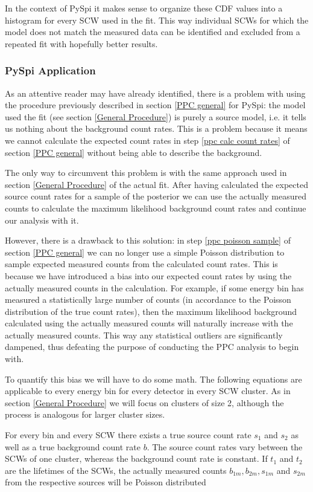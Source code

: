 \documentclass{article}
\begin{document}
In the context of PySpi it makes sense to organize these CDF values into a histogram for every SCW used in the fit. This way individual SCWs for which the model does not match the measured data can be identified and excluded from a repeated fit with hopefully better results.

\subsubsection{PySpi Application}
As an attentive reader may have already identified, there is a problem with using the procedure previously described in section \ref{PPC general} for PySpi: the model used the fit (see section \ref{General Procedure}) is purely a source model, i.e. it tells us nothing about the background count rates. This is a problem because it means we cannot calculate the expected count rates in step \ref{ppc calc count rates} of section \ref{PPC general} without being able to describe the background.

The only way to circumvent this problem is with the same approach used in section \ref{General Procedure} of the actual fit. After having calculated the expected source count rates for a sample of the posterior we can use the actually measured counts to calculate the maximum likelihood background count rates and continue our analysis with it.

However, there is a drawback to this solution: in step \ref{ppc poisson sample} of section \ref{PPC general} we can no longer use a simple Poisson distribution to sample expected measured counts from the calculated count rates. This is because we have introduced a bias into our expected count rates by using the actually measured counts in the calculation. For example, if some energy bin has measured a statistically large number of counts (in accordance to the Poisson distribution of the true count rates), then the maximum likelihood background calculated using the actually measured counts will naturally increase with the actually measured counts. This way any statistical outliers are significantly dampened, thus defeating the purpose of conducting the PPC analysis to begin with.

To quantify this bias we will have to do some math. The following equations are applicable to every energy bin for every detector in every SCW cluster. As in section \ref{General Procedure} we will focus on clusters of size 2, although the process is analogous for larger cluster sizes.

For every bin and every SCW there exists a true source count rate $s_1$ and $s_2$ as well as a true background count rate $b$. The source count rates vary between the SCWs of one cluster, whereas the background count rate is constant. If $t_1$ and $t_2$ are the lifetimes of the SCWs, the actually measured counts $b_{1m}, b_{2m}, s_{1m}$ and $s_{2m}$ from the respective sources will be Poisson distributed
\end{document}

